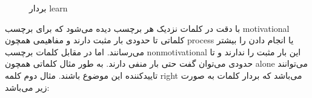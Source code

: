 \documentclass[a4paper]{article}
\begin{document}
\begin{figure}[h!]
\caption{بردار learn}
\label{f1}
\end{figure}
\vspace{10mm}
\newline
با دقت در کلمات نزدیک هر برچسب دیده می‌شود که برای برچسب motivational کلماتی تا حدودی بار مثبت دارند و مفاهیمی همچون process یا انجام دادن را بیشتر می‌رسانند. اما در مقابل کلمات برچسب nonmotivational این بار مثبت را ندارند و تا حدودی می‌توان گفت حتی بار منفی دارند. به طور مثال کلماتی همچون alone می‌توانند تایید‌کننده این موضوع باشند.
\newpage
مثال دوم کلمه right می‌باشد که بردار کلمات به صورت زیر می‌باشد:
\newline
\end{document}
